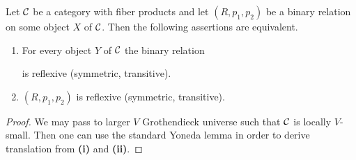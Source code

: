 \begin{fact}\label{fact:relationsintermsofpoints}
Let ${\mathcal C}$ be a category with fiber products and let $(R,p_1,p_2)$ be a binary relation on some object $X$ of ${\mathcal C}$. Then the following assertions are equivalent.
\begin{enumerate}[label=\emph{\textbf{(\roman*)}}, leftmargin=1.5em]
\item For every object $Y$ of ${\mathcal C}$ the binary relation
\begin{center}
\end{center}
is reflexive (symmetric, transitive).
\item $(R,p_1,p_2)$ is reflexive (symmetric, transitive).
\end{enumerate}
\end{fact}
\begin{proof}
We may pass to larger $V$ Grothendieck universe such that ${\mathcal C}$ is locally $V$-small. Then one can use the standard Yoneda lemma in order to derive translation from \textbf{(i)} and \textbf{(ii)}.
\end{proof}

